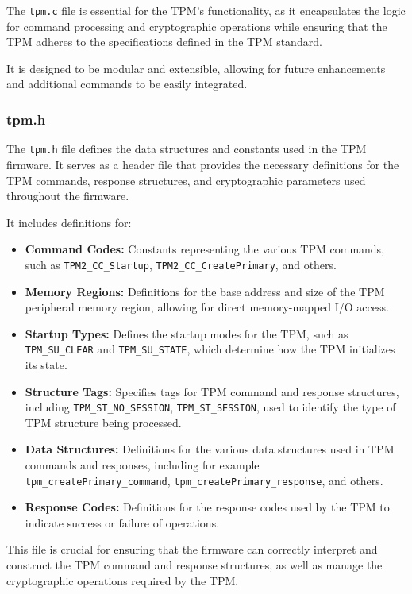 The \texttt{tpm.c} file is essential for the TPM's
functionality, as it encapsulates the logic for command
processing and cryptographic operations while ensuring
that the TPM adheres to the specifications defined in
the TPM standard. 

It is designed to be modular and
extensible, allowing for future enhancements and
additional commands to be easily integrated.

\subsubsection{tpm.h}
The \texttt{tpm.h} file defines the data structures and
constants used in the TPM firmware. It serves as a
header file that provides the necessary definitions
for the TPM commands, response structures, and
cryptographic parameters used throughout the firmware.

It includes definitions for:
\begin{itemize}
    \item \textbf{Command Codes:} Constants representing 
    the various TPM commands, such as 
    \texttt{TPM2\_CC\_Startup}, 
    \texttt{TPM2\_CC\_CreatePrimary}, and others.
    \item \textbf{Memory Regions:} Definitions for the 
    base address and size of the TPM peripheral memory 
    region, allowing for direct memory-mapped I/O access.
    \item \textbf{Startup Types:} Defines the startup 
    modes for the TPM, such as \texttt{TPM\_SU\_CLEAR} 
    and \texttt{TPM\_SU\_STATE}, which determine how 
    the TPM initializes its state.
    \item \textbf{Structure Tags:} Specifies tags 
    for TPM command and response structures, 
    including \texttt{TPM\_ST\_NO\_SESSION}, 
    \texttt{TPM\_ST\_SESSION}, used to 
    identify the type of TPM structure being processed.
    \item \textbf{Data Structures:} Definitions for the 
    various data structures used in TPM commands and 
    responses, including for example 
    \texttt{tpm\_createPrimary\_command}, 
    \texttt{tpm\_createPrimary\_response}, and others.
    \item \textbf{Response Codes:} Definitions for the 
    response codes used by the TPM to indicate success 
    or failure of operations.
\end{itemize}
This file is crucial for ensuring that the firmware
can correctly interpret and construct the TPM command
and response structures, as well as manage the
cryptographic operations required by the TPM.


